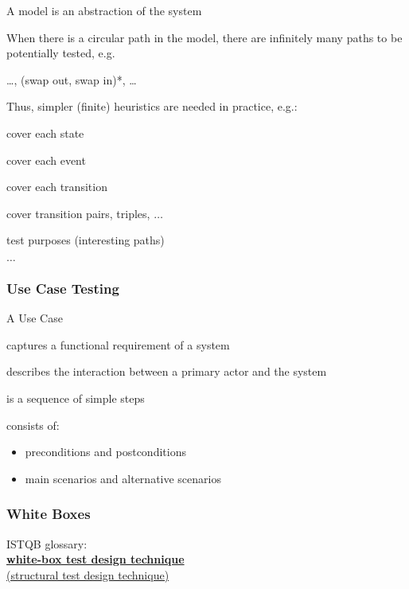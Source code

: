 \begin{itemize*}
	\item A model is an abstraction of the system
	\item When there is a circular path in the model, there are infinitely many paths to be potentially tested, e.g.\
	\begin{itemize*}
		\item \ldots, (swap out, swap in)*, \ldots
	\end{itemize*}
	\item Thus, simpler (finite) heuristics are needed in practice,	e.g.:
	\begin{itemize*}
		\item cover each state
		\item cover each event
		\item cover each transition
		\item cover transition pairs, triples, $\dots$
		\item test purposes (interesting paths)
		\item $\dots$
	\end{itemize*}
\end{itemize*}


\subsubsection{Use Case Testing}
A Use Case
\begin{itemize*}
    \item captures a functional requirement of a system
    \item describes the interaction between a primary actor and
    the system
    \item is a sequence of simple steps
    \item consists of:
    \begin{itemize}
        \item preconditions and postconditions
        \item main scenarios and alternative scenarios
    \end{itemize}
\end{itemize*}

\subsubsection{White Boxes}
ISTQB glossary:\\
\underline{\textbf{white-box test design technique}}\\
\underline{(structural test design technique)}

